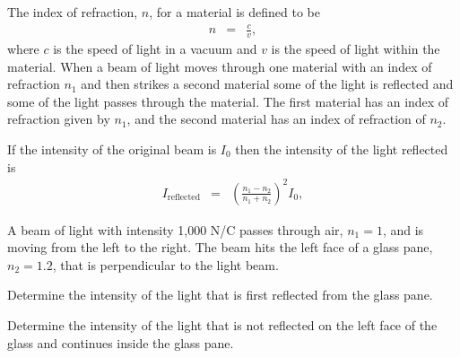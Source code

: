 \begin{problem}
  \item The index of refraction, $n$, for a material is defined to be
  \begin{eqnarray*}
    n & = & \frac{c}{v},
  \end{eqnarray*}
  where $c$ is the speed of light in a vacuum and $v$ is the speed of light within the material.
  When a beam of light moves through one material with an index of refraction $n_1$ and then strikes a second material some of the light is reflected and some of the light passes through the material.
  The first material has an index of refraction given by $n_1$, and the second material has an index of refraction of $n_2$.


  If the intensity of the original beam is $I_0$ then the intensity of the light reflected is
  \begin{eqnarray*}
    I_{\mathrm{reflected}} & = & \left(\frac{n_1-n_2}{n_1+n_2}\right)^2 I_0,
  \end{eqnarray*}

  A beam of light with intensity 1,000 N/C passes through air, $n_1=1$, and is moving from the left to the right.
  The beam hits the left face of a glass pane, $n_2=1.2$, that is perpendicular to the light beam.
  \begin{subproblem}
    \item  Determine the intensity of the light that is first reflected from the glass pane.
    \vfill

    \item Determine the intensity of the light that is not reflected on the left face of the glass and continues inside the glass pane.
      \vfill


\end{subproblem}
\end{problem}

